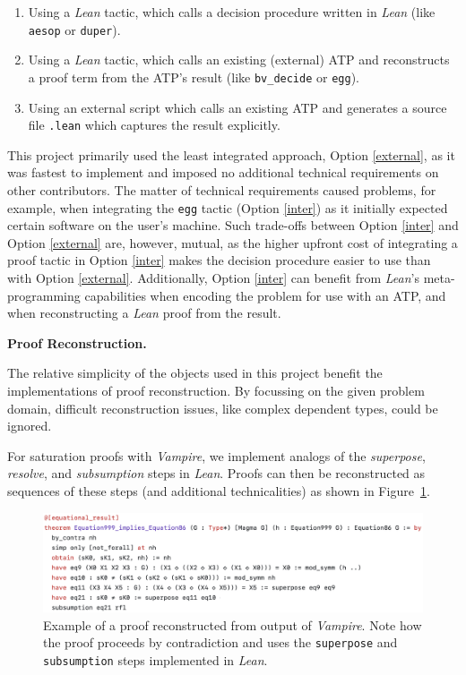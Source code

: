 \begin{enumerate}
    \item Using a \emph{Lean} tactic, which calls a decision procedure written in \emph{Lean} (like \texttt{aesop} or \texttt{duper}).
    \item\label{inter} Using a \emph{Lean} tactic, which calls an existing (external) ATP and reconstructs a proof term from the ATP's result (like \texttt{bv\_decide} or \texttt{egg}).
    \item\label{external} Using an external script which calls an existing ATP and generates a source file \texttt{.lean} which captures the result explicitly.
\end{enumerate}

This project primarily used the least integrated approach, Option \ref{external}, as it was fastest to implement and imposed no additional technical requirements on other contributors.
The matter of technical requirements caused problems, for example, when integrating the \texttt{egg} tactic (Option \ref{inter}) as it initially expected certain software on the user's machine.
Such trade-offs between Option \ref{inter} and Option \ref{external} are, however, mutual, as the higher upfront cost of integrating a proof tactic in Option \ref{inter} makes the decision procedure easier to use than with Option \ref{external}.
Additionally, Option \ref{inter} can benefit from \emph{Lean}'s meta-programming capabilities when encoding the problem for use with an ATP, and when reconstructing a \emph{Lean} proof from the result.

\textbf{Proof Reconstruction.}

The relative simplicity of the objects used in this project benefit the implementations of proof reconstruction.
By focussing on the given problem domain, difficult reconstruction issues, like complex dependent types, could be ignored.

For saturation proofs with \emph{Vampire}, we implement analogs of the \emph{superpose}, \emph{resolve}, and \emph{subsumption} steps in \emph{Lean}.
Proofs can then be reconstructed as sequences of these steps (and additional technicalities) as shown in Figure~\ref{fig:vampire-example}.

\begin{figure}
  \centering
  \includegraphics[width=\textwidth]{vampire-example.png}
  \caption{Example of a proof reconstructed from output of \emph{Vampire}. Note how the proof proceeds by contradiction and uses the \texttt{superpose} and \texttt{subsumption} steps implemented in \emph{Lean}.}
  \label{fig:vampire-example}
\end{figure}

